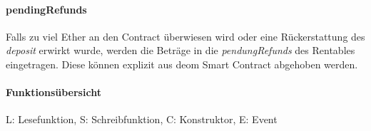 \paragraph{pendingRefunds}
Falls zu viel Ether an den Contract überwiesen wird oder eine Rückerstattung des \emph{deposit} erwirkt wurde, werden die Beträge in die \emph{pendungRefunds} des Rentables eingetragen. Diese können explizit aus deom Smart Contract abgehoben werden.\cite[Miscellaneous/Introduction to Smart Contracts]{solidity.readthedocs.io}

\paragraph{Funktionsübersicht}

L: Lesefunktion, S: Schreibfunktion, C: Konstruktor, E: Event

